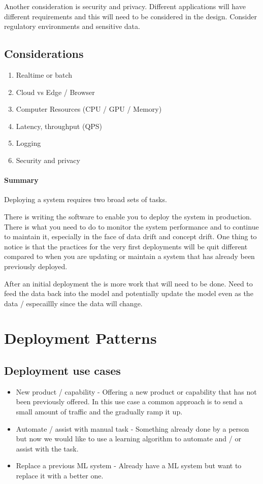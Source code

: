 Another consideration is security and privacy.
Different applications will have different requirements and this will need to be considered in the design.
Consider regulatory environments and sensitive data.

\subsection{Considerations}

\begin{enumerate}
    \item Realtime or batch
    \item Cloud vs Edge / Browser
    \item Computer Resources (CPU / GPU / Memory)
    \item Latency, throughput (QPS)
    \item Logging
    \item Security and privacy
\end{enumerate}

\paragraph{Summary}

Deploying a system requires two broad sets of tasks.

There is writing the software to enable you to deploy the system in production.
There is what you need to do to monitor the system performance and to continue to maintain it, especially in the face of data drift and concept drift.
One thing to notice is that the practices for the very first deployments will be quit different compared to when you are updating or maintain a system that has already been previously deployed.


After an initial deployment the is more work that will need to be done.
Need to feed the data back into the model and potentially update the model even as the data / especaillly since the data will change.

\section{Deployment Patterns}

\subsection{Deployment use cases}

\begin{itemize}
    \item New product / capability - Offering a new product or capability that has not been previously offered.
    In this use case a common approach is to send a small amount of traffic and the gradually ramp it up.
    \item Automate / assist with manual task - Something already done by a person but now we would like to use a learning algorithm to automate and / or assist with the task.
    \item Replace a previous ML system - Already have a ML system but want to replace it with a better one.
\end{itemize}

